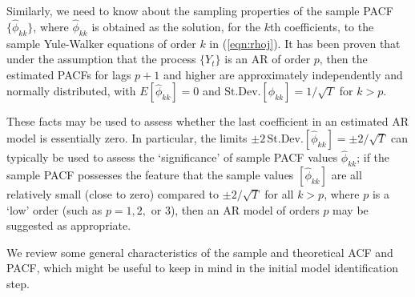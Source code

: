Similarly, we need to know about the sampling properties of the sample PACF $\{\hat{\phi}_{kk}\}$, where $\hat{\phi}_{kk}$ is obtained as the solution, for the $k$th coefficients, to the sample Yule-Walker equations of order $k$ in (\ref{eqn:rhoj}). It has been proven that under the assumption that the process $\{Y_t\}$ is an AR of order $p$, then the estimated PACFs for lags $p+1$ and higher are approximately independently and normally distributed, with $E[\hat{\phi}_{kk}] = 0$ and $\text{St.Dev.}[\hat{\phi}_{kk}] = 1/\sqrt{T}$ for $k>p$.


These facts may be used to assess whether the last coefficient in an estimated AR model is essentially zero. In particular, the limits $\pm2\,\text{St.Dev.}[\hat{\phi}_{kk}] = \pm2/\sqrt{T}$ can typically be used to assess the `significance' of sample PACF values $\hat{\phi}_{kk}$; if the sample PACF possesses the feature that the sample values $[\hat{\phi}_{kk}]$ are all relatively small (close to zero) compared to $\pm2/\sqrt{T}$ for all $k>p$, where $p$ is a `low' order (such as $p= 1,2,$ or $3$), then an AR model of orders $p$ may be suggested as appropriate.


We review some general characteristics of the sample and theoretical ACF and PACF, which might be useful to keep in mind in the initial model identification step. 

